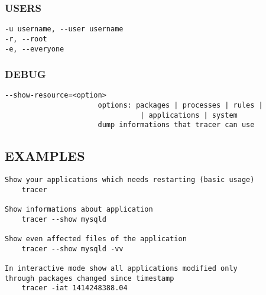 \subsubsection{USERS%
  \label{users}%
}
%
\begin{lstlisting}
-u username, --user username
-r, --root
-e, --everyone
\end{lstlisting}


\subsubsection{DEBUG%
  \label{debug}%
}
%
\begin{lstlisting}
--show-resource=<option>
                      options: packages | processes | rules |
		                        | applications | system
                      dump informations that tracer can use
\end{lstlisting}


\subsection{EXAMPLES%
  \label{examples}%
}
%
\begin{lstlisting}
Show your applications which needs restarting (basic usage)
    tracer

Show informations about application
    tracer --show mysqld

Show even affected files of the application
    tracer --show mysqld -vv

In interactive mode show all applications modified only
through packages changed since timestamp
    tracer -iat 1414248388.04
\end{lstlisting}
